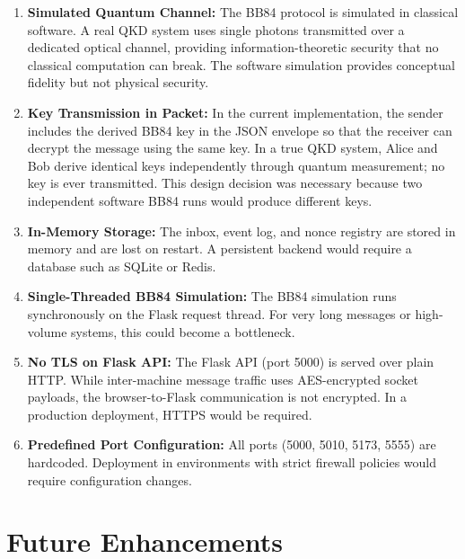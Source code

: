 \begin{enumerate}
    \item \textbf{Simulated Quantum Channel:} The BB84 protocol is simulated in classical software. A real QKD system uses single photons transmitted over a dedicated optical channel, providing information-theoretic security that no classical computation can break. The software simulation provides conceptual fidelity but not physical security.

    \item \textbf{Key Transmission in Packet:} In the current implementation, the sender includes the derived BB84 key in the JSON envelope so that the receiver can decrypt the message using the same key. In a true QKD system, Alice and Bob derive identical keys independently through quantum measurement; no key is ever transmitted. This design decision was necessary because two independent software BB84 runs would produce different keys.

    \item \textbf{In-Memory Storage:} The inbox, event log, and nonce registry are stored in memory and are lost on restart. A persistent backend would require a database such as SQLite or Redis.

    \item \textbf{Single-Threaded BB84 Simulation:} The BB84 simulation runs synchronously on the Flask request thread. For very long messages or high-volume systems, this could become a bottleneck.

    \item \textbf{No TLS on Flask API:} The Flask API (port 5000) is served over plain HTTP. While inter-machine message traffic uses AES-encrypted socket payloads, the browser-to-Flask communication is not encrypted. In a production deployment, HTTPS would be required.

    \item \textbf{Predefined Port Configuration:} All ports (5000, 5010, 5173, 5555) are hardcoded. Deployment in environments with strict firewall policies would require configuration changes.
\end{enumerate}

\section{Future Enhancements}

